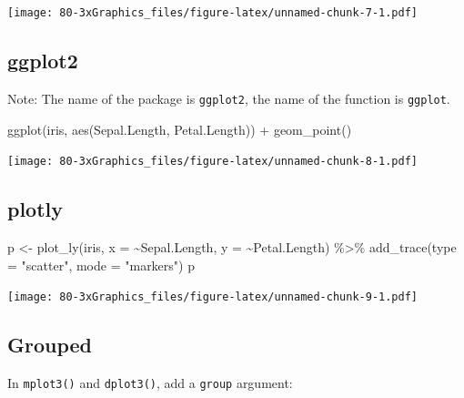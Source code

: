 \documentclass[
]{book}
\newenvironment{Shaded}{\begin{snugshade}}{\end{snugshade}}
\newcommand{\AttributeTok}[1]{\textcolor[rgb]{0.77,0.63,0.00}{#1}}
\newcommand{\FunctionTok}[1]{\textcolor[rgb]{0.00,0.00,0.00}{#1}}
\newcommand{\NormalTok}[1]{#1}
\newcommand{\OtherTok}[1]{\textcolor[rgb]{0.56,0.35,0.01}{#1}}
\newcommand{\SpecialCharTok}[1]{\textcolor[rgb]{0.00,0.00,0.00}{#1}}
\newcommand{\StringTok}[1]{\textcolor[rgb]{0.31,0.60,0.02}{#1}}
\begin{document}
\texttt{[image: 80-3xGraphics\_files/figure-latex/unnamed-chunk-7-1.pdf]}

\hypertarget{ggplot2-1}{%
\subsection{\texorpdfstring{\textbf{ggplot2}}{ggplot2}}\label{ggplot2-1}}

Note: The name of the package is \texttt{ggplot2}, the name of the function is \texttt{ggplot}.

\begin{Shaded}
\begin{Highlighting}[]
\FunctionTok{ggplot}\NormalTok{(iris, }\FunctionTok{aes}\NormalTok{(Sepal.Length, Petal.Length)) }\SpecialCharTok{+} \FunctionTok{geom\_point}\NormalTok{()}
\end{Highlighting}
\end{Shaded}

\texttt{[image: 80-3xGraphics\_files/figure-latex/unnamed-chunk-8-1.pdf]}

\hypertarget{plotly}{%
\subsection{\texorpdfstring{\textbf{plotly}}{plotly}}\label{plotly}}

\begin{Shaded}
\begin{Highlighting}[]
\NormalTok{p }\OtherTok{\textless{}{-}} \FunctionTok{plot\_ly}\NormalTok{(iris, }\AttributeTok{x =} \SpecialCharTok{\textasciitilde{}}\NormalTok{Sepal.Length, }\AttributeTok{y =} \SpecialCharTok{\textasciitilde{}}\NormalTok{Petal.Length) }\SpecialCharTok{\%\textgreater{}\%} 
  \FunctionTok{add\_trace}\NormalTok{(}\AttributeTok{type =} \StringTok{"scatter"}\NormalTok{, }\AttributeTok{mode =} \StringTok{"markers"}\NormalTok{)}
\NormalTok{p}
\end{Highlighting}
\end{Shaded}

\texttt{[image: 80-3xGraphics\_files/figure-latex/unnamed-chunk-9-1.pdf]}

\hypertarget{grouped}{%
\subsection{Grouped}\label{grouped}}

In \texttt{mplot3()} and \texttt{dplot3()}, add a \texttt{group} argument:

\begin{Shaded}
\end{Shaded}
\end{document}
